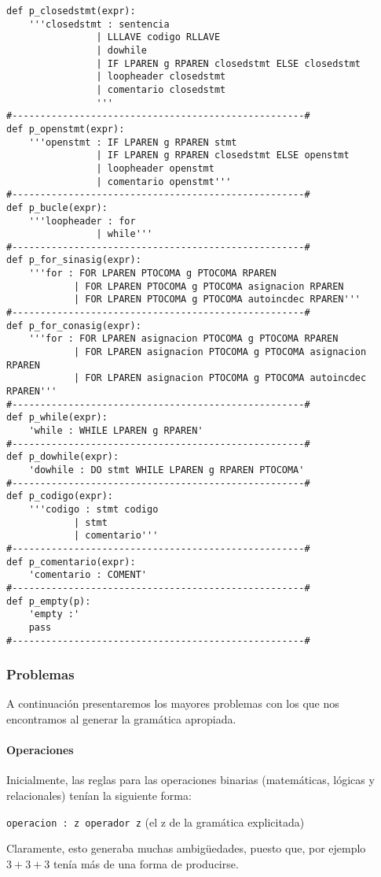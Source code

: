 \begin{verbatim}
def p_closedstmt(expr):
	'''closedstmt : sentencia 
				| LLLAVE codigo RLLAVE
				| dowhile 
				| IF LPAREN g RPAREN closedstmt ELSE closedstmt
				| loopheader closedstmt
				| comentario closedstmt
				'''
#----------------------------------------------------#
def p_openstmt(expr):
	'''openstmt : IF LPAREN g RPAREN stmt
				| IF LPAREN g RPAREN closedstmt ELSE openstmt
				| loopheader openstmt
				| comentario openstmt'''
#----------------------------------------------------#
def p_bucle(expr):
	'''loopheader : for
				| while'''
#----------------------------------------------------#
def p_for_sinasig(expr):
	'''for : FOR LPAREN PTOCOMA g PTOCOMA RPAREN
			| FOR LPAREN PTOCOMA g PTOCOMA asignacion RPAREN 
			| FOR LPAREN PTOCOMA g PTOCOMA autoincdec RPAREN'''
#----------------------------------------------------#
def p_for_conasig(expr):
	'''for : FOR LPAREN asignacion PTOCOMA g PTOCOMA RPAREN
			| FOR LPAREN asignacion PTOCOMA g PTOCOMA asignacion RPAREN
			| FOR LPAREN asignacion PTOCOMA g PTOCOMA autoincdec RPAREN'''
#----------------------------------------------------#
def p_while(expr):
	'while : WHILE LPAREN g RPAREN'
#----------------------------------------------------#
def p_dowhile(expr):
	'dowhile : DO stmt WHILE LPAREN g RPAREN PTOCOMA'
#----------------------------------------------------#
def p_codigo(expr):
	'''codigo : stmt codigo
		    | stmt
		    | comentario'''
#----------------------------------------------------#
def p_comentario(expr):
	'comentario : COMENT'
#----------------------------------------------------#
def p_empty(p):
	'empty :'
	pass
#----------------------------------------------------#
\end{verbatim}


\subsubsection{Problemas}

A continuación presentaremos los mayores problemas con los que nos encontramos al generar la gramática apropiada.

\paragraph{Operaciones}
Inicialmente, las reglas para las operaciones binarias (matemáticas, lógicas y relacionales) tenían la siguiente forma:

{\tt operacion : z operador z} (el z de la gramática explicitada)

Claramente, esto generaba muchas ambigüedades, puesto que, por ejemplo $3+3+3$ tenía más de una forma de producirse.

